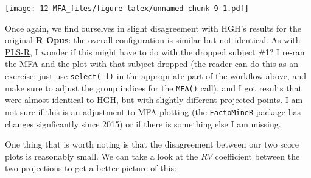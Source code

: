 \documentclass[
]{book}
\newenvironment{Shaded}{\begin{snugshade}}{\end{snugshade}}
\newcommand{\AttributeTok}[1]{\textcolor[rgb]{0.13,0.29,0.53}{#1}}
\newcommand{\DecValTok}[1]{\textcolor[rgb]{0.00,0.00,0.81}{#1}}
\newcommand{\FunctionTok}[1]{\textcolor[rgb]{0.13,0.29,0.53}{\textbf{#1}}}
\newcommand{\NormalTok}[1]{#1}
\newcommand{\SpecialCharTok}[1]{\textcolor[rgb]{0.81,0.36,0.00}{\textbf{#1}}}
\newcommand{\StringTok}[1]{\textcolor[rgb]{0.31,0.60,0.02}{#1}}
\begin{document}
\begin{Shaded}
\end{Shaded}

\texttt{[image: 12-MFA\_files/figure-latex/unnamed-chunk-9-1.pdf]}

Once again, we find ourselves in slight disagreement with HGH's results for the original \textbf{R Opus}: the overall configuration is similar but not identical. As \hyperref[external-preference-mapping]{with PLS-R}, I wonder if this might have to do with the dropped subject \#1? I re-ran the MFA and the plot with that subject dropped (the reader can do this as an exercise: just use \texttt{select(-}1\texttt{)} in the appropriate part of the workflow above, and make sure to adjust the group indices for the \texttt{MFA()} call), and I got results that were almost identical to HGH, but with slightly different projected points. I am not sure if this is an adjustment to MFA plotting (the \texttt{FactoMineR} package has changes signficantly since 2015) or if there is something else I am missing.

One thing that is worth noting is that the disagreement between our two score plots is reasonably small. We can take a look at the \(RV\) coefficient between the two projections to get a better picture of this:
\end{document}
